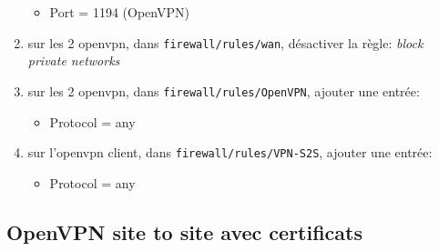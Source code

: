 \documentclass[a4paper]{article}
\begin{document}
\begin{enumerate}
\begin{itemize}
        \item Port = 1194 (OpenVPN)
    \end{itemize}
    \item sur les 2 openvpn, dans \texttt{firewall/rules/wan}, désactiver la règle: \textit{block private networks}
    \item sur les 2 openvpn, dans \texttt{firewall/rules/OpenVPN}, ajouter une entrée:
    \begin{itemize}
        \item Protocol = any
    \end{itemize}
    \item sur l'openvpn client, dans \texttt{firewall/rules/VPN-S2S}, ajouter une entrée:
    \begin{itemize}
        \item Protocol = any
    \end{itemize}
\end{enumerate}










\subsection{OpenVPN site to site avec certificats}
\end{document}
